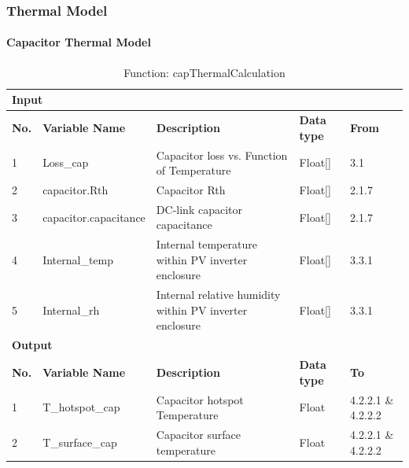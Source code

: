 \documentclass{article}
\begin{document}
\subsubsection{Thermal Model}
\paragraph{Capacitor Thermal Model}
\begin{table}[h]
\centering
\caption{Function: capThermalCalculation}
\begin{tabular}{|l|l|p{6cm}|l|l|}
\hline
\multicolumn{5}{|l|}{\textbf{Input}} \\ \hline
\textbf{No.} & \textbf{Variable Name} & \textbf{Description} & \textbf{Data type} & \textbf{From} \\ \hline
1 & Loss\_cap & Capacitor loss vs. Function of Temperature & Float[] & 3.1 \\ \hline
2 & capacitor.Rth & Capacitor Rth & Float[] & 2.1.7 \\ \hline
3 & capacitor.capacitance & DC-link capacitor capacitance & Float[] & 2.1.7 \\ \hline
4 & Internal\_temp & Internal temperature within PV inverter enclosure & Float[] & 3.3.1 \\ \hline
5 & Internal\_rh & Internal relative humidity within PV inverter enclosure & Float[] & 3.3.1 \\ \hline
\multicolumn{5}{|l|}{\textbf{Output}} \\ \hline
\textbf{No.} & \textbf{Variable Name} & \textbf{Description} & \textbf{Data type} & \textbf{To} \\ \hline
1 & T\_hotspot\_cap & Capacitor hotspot Temperature & Float & 4.2.2.1 \& 4.2.2.2 \\ \hline
2 & T\_surface\_cap & Capacitor surface temperature & Float & 4.2.2.1 \& 4.2.2.2 \\ \hline
\end{tabular}
\end{table}
\end{document}
